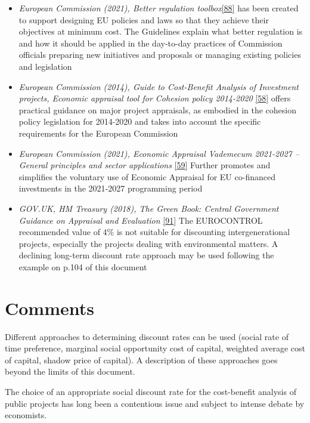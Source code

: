 \documentclass[
  11pt,
  a4paper,
]{book}
\begin{document}
\begin{itemize}
\item
  \emph{European Commission (2021), Better regulation
  toolbox}\protect\hyperlink{ref-ecbr2021}{{[}88{]}} has been created to
  support designing EU policies and laws so that they achieve their
  objectives at minimum cost. The Guidelines explain what better
  regulation is and how it should be applied in the day-to-day practices
  of Commission officials preparing new initiatives and proposals or
  managing existing policies and legislation
\item
  \emph{European Commission (2014), Guide to Cost-Benefit Analysis of
  Investment projects, Economic appraisal tool for Cohesion policy
  2014-2020} \protect\hyperlink{ref-ecdgregio2014}{{[}58{]}} offers
  practical guidance on major project appraisals, as embodied in the
  cohesion policy legislation for 2014-2020 and takes into account the
  specific requirements for the European Commission
\item
  \emph{European Commission (2021), Economic Appraisal Vademecum
  2021-2027 -- General principles and sector applications}
  \protect\hyperlink{ref-ecdgregiovademecum2022}{{[}59{]}} Further
  promotes and simplifies the voluntary use of Economic Appraisal for EU
  co-financed investments in the 2021-2027 programming period
\item
  \emph{GOV.UK, HM Treasury (2018), The Green Book: Central Government
  Guidance on Appraisal and Evaluation}
  \protect\hyperlink{ref-greenbook:2018}{{[}91{]}} The EUROCONTROL
  recommended value of 4\% is not suitable for discounting
  intergenerational projects, especially the projects dealing with
  environmental matters. A declining long-term discount rate approach
  may be used following the example on p.104 of this document
\end{itemize}

\hypertarget{comments-15}{%
\section{Comments}\label{comments-15}}

Different approaches to determining discount rates can be used (social
rate of time preference, marginal social opportunity cost of capital,
weighted average cost of capital, shadow price of capital). A
description of these approaches goes beyond the limits of this document.

The choice of an appropriate social discount rate for the cost-benefit
analysis of public projects has long been a contentious issue and
subject to intense debate by economists.
\end{document}
